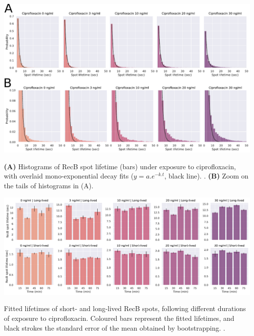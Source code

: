 \begin{suppfigure*}[htbp]
\begin{center}
\includegraphics[width=\linewidth]{SI_Figures/Monoexp_fits_cipro.pdf}
\end{center}
\caption{\textbf{(A)} Histograms of RecB spot lifetime (bars) under exposure to ciprofloxacin, with overlaid mono-exponential decay fits ($y=a.e^{-k.t}$, black line). .  \textbf{(B)} Zoom on the tails of histograms in (A).}
\label{SIFig:monoexp_fits}
\end{suppfigure*}

\begin{suppfigure*}[htbp]
    \begin{center}
    \includegraphics[width=\linewidth]{SI_Figures/RecB_lifetime_timepoints.pdf}
    \end{center}
    \caption{Fitted lifetimes of short- and long-lived RecB spots, following different durations of exposure to ciprofloxacin. Coloured bars represent the fitted lifetimes, and black strokes the standard error of the mean obtained by bootstrapping. . }
    \label{SIFig:RecB_lifetimes_timepoints}
    \end{suppfigure*}


